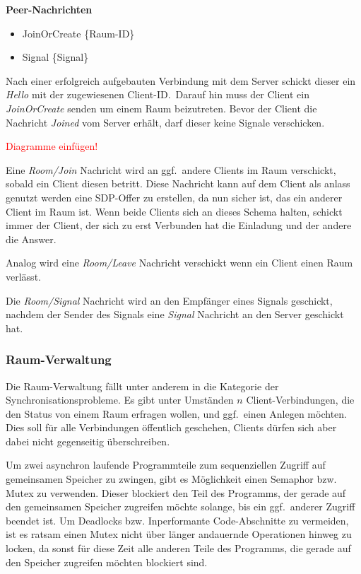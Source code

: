 \documentclass{IEEEtran}
\begin{document}
\begin{twocolumn}
\vspace{0.5em}

\textbf{Peer-Nachrichten}

\begin{itemize}
	\item JoinOrCreate \{Raum-ID\}
	\item Signal \{Signal\}
\end{itemize}

\vspace{0.5em}

Nach einer erfolgreich aufgebauten Verbindung mit dem Server schickt dieser ein
\textit{Hello} mit der zugewiesenen Client-ID.\ Darauf hin muss der Client ein
\textit{JoinOrCreate} senden um einem Raum beizutreten. Bevor der Client die
Nachricht \textit{Joined} vom Server erhält, darf dieser keine Signale
verschicken.

\textcolor{red}{Diagramme einfügen!}

Eine \textit{Room/Join} Nachricht wird an ggf.\ andere Clients im Raum
verschickt, sobald ein Client diesen betritt. Diese Nachricht kann auf dem
Client als anlass genutzt werden eine SDP-Offer zu erstellen, da nun sicher
ist, das ein anderer Client im Raum ist. Wenn beide Clients sich an dieses
Schema halten, schickt immer der Client, der sich zu erst Verbunden hat die
Einladung und der andere die Answer.

Analog wird eine \textit{Room/Leave} Nachricht verschickt wenn ein Client einen
Raum verlässt.

Die \textit{Room/Signal} Nachricht wird an den Empfänger eines Signals
geschickt, nachdem der Sender des Signals eine \textit{Signal} Nachricht an den
Server geschickt hat.

\subsubsection{Raum-Verwaltung}

Die Raum-Verwaltung fällt unter anderem in die Kategorie der
Synchronisationsprobleme. Es gibt unter Umständen $n$ Client-Verbindungen, die
den Status von einem Raum erfragen wollen, und ggf.\ einen Anlegen möchten. Dies
soll für alle Verbindungen öffentlich geschehen, Clients dürfen sich aber dabei
nicht gegenseitig überschreiben.


Um zwei asynchron laufende Programmteile zum sequenziellen Zugriff auf
gemeinsamen Speicher zu zwingen, gibt es Möglichkeit einen Semaphor bzw. Mutex
zu verwenden. Dieser blockiert den Teil des Programms, der gerade auf den
gemeinsamen Speicher zugreifen möchte solange, bis ein ggf.\ anderer Zugriff
beendet ist. Um Deadlocks bzw. Inperformante Code-Abschnitte zu vermeiden, ist
es ratsam einen Mutex nicht über länger andauernde Operationen hinweg zu
locken, da sonst für diese Zeit alle anderen Teile des Programms, die gerade
auf den Speicher zugreifen möchten blockiert sind.


\end{twocolumn}
\end{document}
